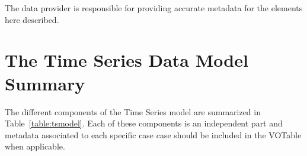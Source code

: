 \documentclass[11pt,a4paper]{ivoa}
\begin{document}
The data provider is responsible for providing accurate metadata for the elements here described.



\section{The Time Series Data Model Summary}
The different components of the Time Series model are summarized in Table~\ref{table:tsmodel}. Each of these components is an independent part and metadata associated to each specific case case should be included in the VOTable when applicable. 
\end{document}
